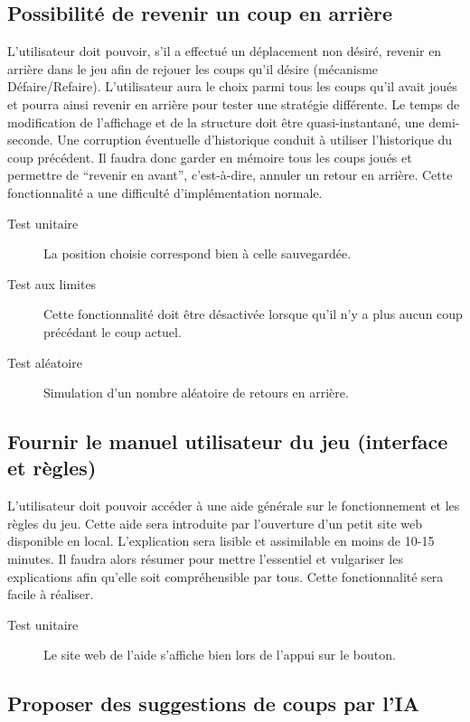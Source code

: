 \subsection{Possibilité de revenir un coup en arrière}

L’utilisateur doit pouvoir, s’il a effectué un déplacement non désiré, revenir en arrière dans le jeu afin de rejouer les coups qu’il désire (mécanisme Défaire/Refaire). L'utilisateur aura le choix parmi tous les coups qu'il avait joués et pourra ainsi revenir en arrière pour tester une stratégie différente. Le temps de modification de l'affichage et de la structure doit être quasi-instantané, une demi-seconde. Une corruption éventuelle d'historique conduit à utiliser l'historique du coup précédent. Il faudra donc garder en mémoire tous les coups joués et permettre de ``revenir en avant'', c'est-à-dire, annuler un retour en arrière. Cette fonctionnalité a une difficulté d'implémentation normale.

\begin{description}
\item[Test unitaire] La position choisie correspond bien à celle sauvegardée.
\item[Test aux limites] Cette fonctionnalité doit être désactivée lorsque qu’il n’y a plus aucun coup précédant le coup actuel.
\item[Test aléatoire] Simulation d'un nombre aléatoire de retours en arrière.
\end{description}

\subsection{Fournir le manuel utilisateur du jeu (interface et règles)}

L'utilisateur doit pouvoir accéder à une aide générale sur le fonctionnement et les règles du jeu. Cette aide sera introduite par l’ouverture d’un petit site web disponible en local. L'explication sera lisible et assimilable en moins de 10-15 minutes. Il faudra alors résumer pour mettre l'essentiel et vulgariser les explications afin qu'elle soit compréhensible par tous. Cette fonctionnalité sera facile à réaliser.

\begin{description}
\item[Test unitaire] Le site web de l’aide s’affiche bien lors de l’appui sur le bouton.
\end{description}

\subsection{Proposer des suggestions de coups par l'IA}

